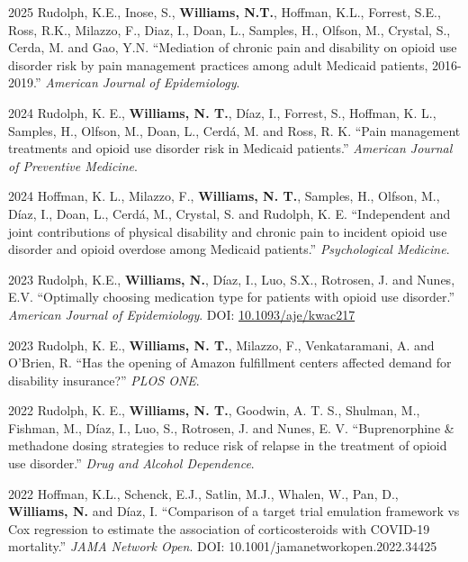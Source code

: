 \documentclass[12pt,letterpaper]{report}
\begin{document}
    \begin{tablist}
    
    \item[2025] \tab Rudolph, K.E., Inose, S., \textbf{Williams, N.T.}, Hoffman, K.L., Forrest, S.E., Ross, R.K., Milazzo, F., Diaz, I., Doan, L., Samples, H., Olfson, M., Crystal, S., Cerda, M. and Gao, Y.N. \enquote{Mediation of chronic pain and disability on opioid use disorder risk by pain management practices among adult Medicaid patients, 2016-2019.} \textit{American Journal of Epidemiology}.
    
    \item[2024] \tab Rudolph, K. E., \textbf{Williams, N. T.}, Díaz, I., Forrest, S., Hoffman, K. L., Samples, H., Olfson, M., Doan, L., Cerdá, M. and Ross, R. K. \enquote{Pain management treatments and opioid use disorder risk in Medicaid patients.} \textit{American Journal of Preventive Medicine}.
    
    \item[2024] \tab Hoffman, K. L., Milazzo, F., \textbf{Williams, N. T.}, Samples, H., Olfson, M., Díaz, I., Doan, L., Cerdá, M., Crystal, S. and Rudolph, K. E. \enquote{Independent and joint contributions of physical disability and chronic pain to incident opioid use disorder and opioid overdose among Medicaid patients.} \textit{Psychological Medicine}.
    
        \item[2023] \tab Rudolph, K.E., \textbf{Williams, N.}, Díaz, I., Luo, S.X., Rotrosen, J. and Nunes, E.V. \enquote{Optimally choosing medication type for patients with opioid use disorder.} \textit{American Journal of Epidemiology}. DOI: \href{https://doi.org/10.1093/aje/kwac217}{10.1093/aje/kwac217}
        
        \item[2023] \tab Rudolph, K. E., \textbf{Williams, N. T.}, Milazzo, F., Venkataramani, A. and O’Brien, R. \enquote{Has the opening of Amazon fulfillment centers affected demand for disability insurance?} \textit{PLOS ONE}.
        
        \item[2022] \tab Rudolph, K. E., \textbf{Williams, N. T.}, Goodwin, A. T. S., Shulman, M., Fishman, M., Díaz, I., Luo, S., Rotrosen, J. and Nunes, E. V. \enquote{Buprenorphine \& methadone dosing strategies to reduce risk of relapse in the treatment of opioid use disorder.} \textit{Drug and Alcohol Dependence}.
        
            	\item[2022]\tab Hoffman, K.L., Schenck, E.J., Satlin, M.J., Whalen, W., Pan, D., \textbf{Williams, N.} and Díaz, I. \enquote{Comparison of a target trial emulation framework vs Cox regression to estimate the association of corticosteroids with COVID-19 mortality.} \textit{JAMA Network Open}. DOI: 10.1001/jamanetworkopen.2022.34425


\end{tablist}
\end{document}
